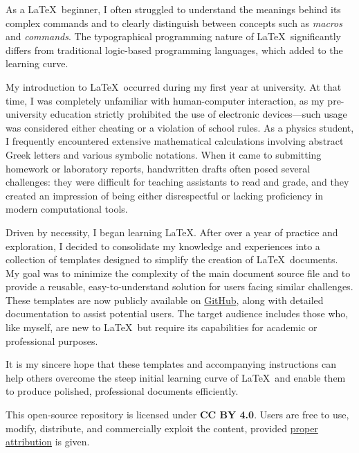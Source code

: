     As a \LaTeX\ beginner, I often struggled to understand the meanings behind its complex commands and to clearly distinguish between concepts such as \emph{macros} and \emph{commands}. The typographical programming nature of \LaTeX\ significantly differs from traditional logic-based programming languages, which added to the learning curve.

    My introduction to \LaTeX\ occurred during my first year at university. At that time, I was completely unfamiliar with human-computer interaction, as my pre-university education strictly prohibited the use of electronic devices—such usage was considered either cheating or a violation of school rules. As a physics student, I frequently encountered extensive mathematical calculations involving abstract Greek letters and various symbolic notations. When it came to submitting homework or laboratory reports, handwritten drafts often posed several challenges: they were difficult for teaching assistants to read and grade, and they created an impression of being either disrespectful or lacking proficiency in modern computational tools.

    Driven by necessity, I began learning \LaTeX. After over a year of practice and exploration, I decided to consolidate my knowledge and experiences into a collection of templates designed to simplify the creation of \LaTeX\ documents. My goal was to minimize the complexity of the main document source file and to provide a reusable, easy-to-understand solution for users facing similar challenges. These templates are now publicly available on \href{https://github.com/SweetPastry/spTemplate?tab=CC-BY-4.0-1-ov-file}{GitHub}, along with detailed documentation to assist potential users. The target audience includes those who, like myself, are new to \LaTeX\ but require its capabilities for academic or professional purposes.

    It is my sincere hope that these templates and accompanying instructions can help others overcome the steep initial learning curve of \LaTeX\ and enable them to produce polished, professional documents efficiently.
    
    This open-source repository is licensed under \textbf{CC BY 4.0}. Users are free to use, modify, distribute, and commercially exploit the content, provided \href{https://github.com/SweetPastry/spTemplate/blob/main/LICENSE}{proper attribution} is given.
